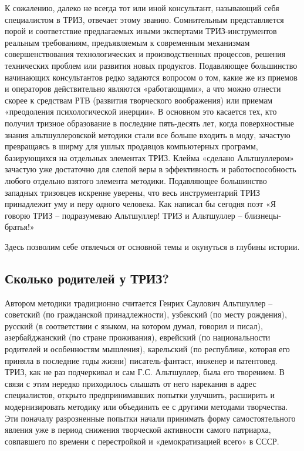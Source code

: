 \documentclass[11pt,a4paper]{article}
\begin{document}
К сожалению, далеко не всегда тот или иной консультант, называющий себя
специалистом в ТРИЗ, отвечает этому званию. Сомнительным представляется порой
и соответствие предлагаемых иными экспертами ТРИЗ-инструментов реальным
требованиям, предъявляемым к современным механизмам совершенствования
технологических и производственных процессов, решения технических проблем или
развития новых продуктов. Подавляющее большинство начинающих консультантов
редко задаются вопросом о том, какие же из приемов и операторов действительно
являются «работающими», а что можно отнести скорее к средствам РТВ (развития
творческого воображения) или приемам «преодоления психологической инерции». В
основном это касается тех, кто получил тризное образование в последние
пять-десять лет, когда поверхностные знания альтшуллеровской методики стали
все больше входить в моду, зачастую превращаясь в ширму для ушлых продавцов
компьютерных программ, базирующихся на отдельных элементах ТРИЗ. Клейма
«сделано Альтшуллером» зачастую уже достаточно для слепой веры в эффективность
и работоспособность любого отдельно взятого элемента методики. Подавляющее
большинство западных тризовцев искренне уверены, что весь инструментарий ТРИЗ
принадлежит уму и перу одного человека. Как написал бы сегодня поэт «Я говорю
ТРИЗ -- подразумеваю Альтшуллер! ТРИЗ и Альтшуллер -- близнецы-братья!»

Здесь позволим себе отвлечься от основной темы и окунуться в глубины истории.

\subsection*{Сколько родителей у ТРИЗ?}

Автором методики традиционно считается Генрих Саулович Альтшуллер -- советский
(по гражданской принадлежности), узбекский (по месту рождения), русский (в
соответствии с языком, на котором думал, говорил и писал), азербайджанский (по
стране проживания), еврейский (по национальности родителей и особенностям
мышления), карельский (по республике, которая его приняла в последние годы
жизни) писатель-фантаст, инженер и патентовед. ТРИЗ, как не раз подчеркивал и
сам Г.С. Альтшуллер, была его творением. В связи с этим нередко приходилось
слышать от него нарекания в адрес специалистов, открыто предпринимавших
попытки улучшить, расширить и модернизировать методику или объединить ее с
другими методами творчества. Эти поначалу разрозненные попытки начали
принимать форму самостоятельного явления уже в период снижения творческой
активности самого патриарха, совпавшего по времени с перестройкой и
«демократизацией всего» в СССР.
\end{document}
